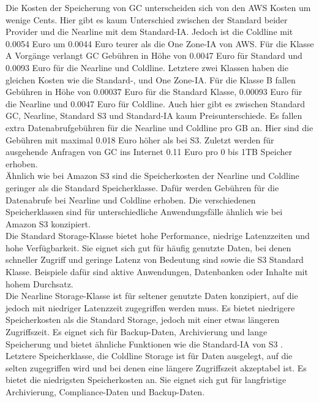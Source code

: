 Die Kosten der Speicherung von GC unterscheiden sich von den AWS Kosten um wenige Cents. Hier gibt es kaum Unterschied zwischen der Standard beider Provider und die Nearline mit dem Standard-IA. Jedoch ist die Coldline mit 0.0054 Euro um 0.0044 Euro teurer als die One Zone-IA von AWS. Für die Klasse A Vorgänge verlangt GC Gebühren in Höhe von 0.0047 Euro für Standard und 0.0093 Euro für die Nearline und Coldline. Letztere zwei Klassen haben die gleichen Kosten wie die Standard-, und One Zone-IA. Für die Klasse B fallen Gebühren in Höhe von 0.00037 Euro für die Standard Klasse, 0.00093 Euro für die Nearline und 0.0047 Euro für Coldline. Auch hier gibt es zwischen Standard GC, Nearline, Standard S3 und Standard-IA kaum Preisunterschiede. Es fallen extra Datenabrufgebühren für die Nearline und Coldline pro GB an. Hier sind die Gebühren mit maximal 0.018 Euro höher als bei S3. Zuletzt werden für ausgehende Anfragen von GC ins Internet 0.11 Euro pro 0 bis 1TB Speicher erhoben.\\

Ähnlich wie bei Amazon S3 sind die Speicherkosten der Nearline und Coldline geringer als die Standard Speicherklasse. Dafür werden Gebühren für die Datenabrufe bei Nearline und Coldline erhoben. Die verschiedenen Speicherklassen sind für unterschiedliche Anwendungsfälle ähnlich wie bei Amazon S3 konzipiert.\\

Die Standard Storage-Klasse bietet hohe Performance, niedrige Latenzzeiten und hohe Verfügbarkeit. Sie eignet sich gut für häufig genutzte Daten, bei denen schneller Zugriff und geringe Latenz von Bedeutung sind sowie die S3 Standard Klasse. Beispiele dafür sind aktive Anwendungen, Datenbanken oder Inhalte mit hohem Durchsatz.\\ 
Die Nearline Storage-Klasse ist für seltener genutzte Daten konzipiert, auf die jedoch mit niedriger Latenzzeit zugegriffen werden muss. Es bietet niedrigere Speicherkosten als die Standard Storage, jedoch mit einer etwas längeren Zugriffszeit. Es eignet sich für Backup-Daten, Archivierung und lange Speicherung und bietet ähnliche Funktionen wie die Standard-IA von S3 .\\
Letztere Speicherklasse, die Coldline Storage ist für Daten ausgelegt, auf die selten zugegriffen wird und bei denen eine längere Zugriffszeit akzeptabel ist. Es bietet die niedrigsten Speicherkosten an. Sie eignet sich gut für langfristige Archivierung, Compliance-Daten und Backup-Daten.\\ 

